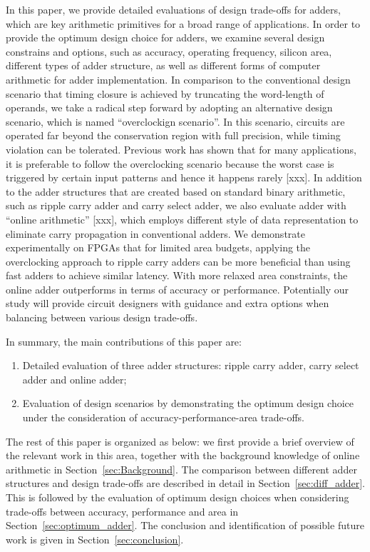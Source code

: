 \documentclass[10pt, conference, compsocconf]{IEEEtran}
\begin{document}
In this paper, we provide detailed evaluations of design trade-offs for adders, which are key arithmetic primitives for a broad range of applications. In order to provide the optimum design choice for adders, we examine several design constrains and options, such as accuracy, operating frequency, silicon area, different types of adder structure, as well as different forms of computer arithmetic for adder implementation. In comparison to the conventional design scenario that timing closure is achieved by truncating the word-length of operands, we take a radical step forward by adopting an alternative design scenario, which is named ``overclockign scenario''. In this scenario, circuits are operated far beyond the conservation region with full precision, while timing violation can be tolerated. Previous work has shown that for many applications, it is preferable to follow the overclocking scenario because the worst case is triggered by certain input patterns and hence it happens rarely [xxx]. In addition to the adder structures that are created based on standard binary arithmetic, such as ripple carry adder and carry select adder, we also evaluate adder with ``online arithmetic'' [xxx], which employs different style of data representation to eliminate carry propagation in conventional adders. We demonstrate experimentally on FPGAs that for limited area budgets, applying the overclocking approach to ripple carry adders can be more beneficial than using fast adders to achieve similar latency. With more relaxed area constraints, the online adder outperforms in terms of accuracy or performance. Potentially our study will provide circuit designers with guidance and extra options when balancing between various design trade-offs.

In summary, the main contributions of this paper are:
\begin{enumerate}
  \item Detailed evaluation of three adder structures: ripple carry adder, carry select adder and online adder; 
  \item Evaluation of design scenarios by demonstrating the optimum design choice under the consideration of accuracy-performance-area trade-offs.
\end{enumerate}

The rest of this paper is organized as below: we first provide a brief overview of the relevant work in this area, together with the background knowledge of online arithmetic in Section~\ref{sec:Background}. The comparison between different adder structures and design trade-offs are described in detail in Section~\ref{sec:diff_adder}. This is followed by the evaluation of optimum design choices when considering trade-offs between accuracy, performance and area in Section~\ref{sec:optimum_adder}. The conclusion and identification of possible future work is given in Section~\ref{sec:conclusion}.
\end{document}
